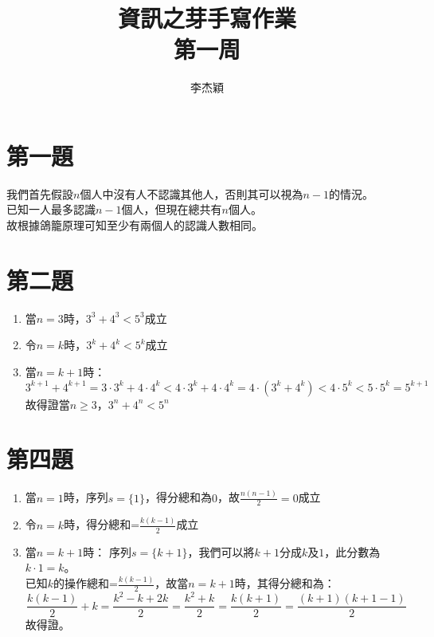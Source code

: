 \documentclass[12pt,a4paper]{article}
\title{資訊之芽手寫作業\\第一周}
\author{李杰穎}
\date{}
\begin{document}
\maketitle
\section{第一題}
我們首先假設$n$個人中沒有人不認識其他人，否則其可以視為$n-1$的情況。\\
已知一人最多認識$n-1$個人，但現在總共有$n$個人。\\
故根據鴿籠原理可知至少有兩個人的認識人數相同。\\
\section{第二題}
\begin{enumerate}
    \item  當$n=3$時，$3^3 + 4^3 < 5^3$成立
    \item 令$n=k$時，$3^k + 4^k < 5^k$成立
    \item 當$n=k+1$時：
        $$
        3^{k+1} + 4^{k+1} = 3 \cdot 3^k + 4 \cdot 4^k < 4 \cdot 3^k + 4 \cdot 4^k = 4 \cdot (3^k+4^k) < 4 \cdot 5^k <5 \cdot 5^k = 5^{k+1}
        $$
    故得證當$n \geq 3，3^n + 4^n < 5^n$
\end{enumerate}
\section{第四題}
\begin{enumerate}
    
    \item 當$n=1$時，序列$s=\{1\}$，得分總和為$0$，故$\frac{n(n-1)}{2}=0$成立
    \item 令$n=k$時，得分總和=$\frac{k(k-1)}{2}$成立
    \item 當$n=k+1$時：
        序列$s=\{k+1\}$，我們可以將$k+1$分成$k$及$1$，此分數為$k \cdot 1 = k$。\\
        已知$k$的操作總和=$\frac{k(k-1)}{2}$，故當$n=k+1$時，其得分總和為：\\
        $$\frac{k(k-1)}{2}+k=\frac{k^2-k+2k}{2} = \frac{k^2+k}{2} = \frac{k(k+1)}{2} = \frac{(k+1)(k+1-1)}{2}$$
        故得證。
        
\end{enumerate}
\end{document}
